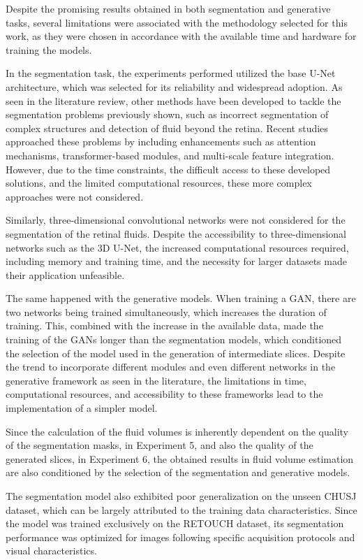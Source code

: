 Despite the promising results obtained in both segmentation and generative tasks, several limitations were associated with the methodology selected for this work, as they were chosen in accordance with the available time and hardware for training the models.
\par
In the segmentation task, the experiments performed utilized the base U-Net architecture, which was selected for its reliability and widespread adoption. As seen in the literature review, other methods have been developed to tackle the segmentation problems previously shown, such as incorrect segmentation of complex structures and detection of fluid beyond the retina. Recent studies approached these problems by including enhancements such as attention mechanisms, transformer-based modules, and multi-scale feature integration. However, due to the time constraints, the difficult access to these developed solutions, and the limited computational resources, these more complex approaches were not considered.
\par
Similarly, three-dimensional convolutional networks were not considered for the segmentation of the retinal fluids. Despite the accessibility to three-dimensional networks such as the 3D U-Net, the increased computational resources required, including memory and training time, and the necessity for larger datasets made their application unfeasible.
\par
The same happened with the generative models. When training a GAN, there are two networks being trained simultaneously, which increases the duration of training. This, combined with the increase in the available data, made the training of the GANs longer than the segmentation models, which conditioned the selection of the model used in the generation of intermediate slices. Despite the trend to incorporate different modules and even different networks in the generative framework as seen in the literature, the limitations in time, computational resources, and accessibility to these frameworks lead to the implementation of a simpler model.
\par
Since the calculation of the fluid volumes is inherently dependent on the quality of the segmentation masks, in Experiment 5, and also the quality of the generated slices, in Experiment 6, the obtained results in fluid volume estimation are also conditioned by the selection of the segmentation and generative models.
\par
The segmentation model also exhibited poor generalization on the unseen CHUSJ dataset, which can be largely attributed to the training data characteristics. Since the model was trained exclusively on the RETOUCH dataset, its segmentation performance was optimized for images following specific acquisition protocols and visual characteristics.
